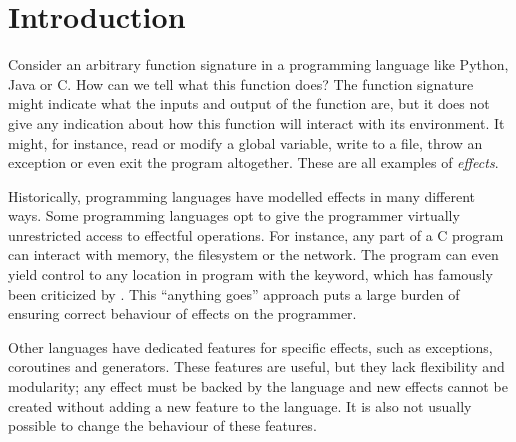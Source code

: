 \chapter{Introduction}\label{chap:introduction}


Consider an arbitrary function signature in a programming language like Python, Java or C. How can we tell what this function does? The function signature might indicate what the inputs and output of the function are, but it does not give any indication about how this function will interact with its environment. It might, for instance, read or modify a global variable, write to a file, throw an exception or even exit the program altogether. These are all examples of \emph{effects}.

Historically, programming languages have modelled effects in many different ways. Some programming languages opt to give the programmer virtually unrestricted access to effectful operations. For instance, any part of a C program can interact with memory, the filesystem or the network. The program can even yield control to any location in program with the  keyword, which has famously been criticized by \textcite{dijkstra_letters_1968}. This ``anything goes'' approach puts a large burden of ensuring correct behaviour of effects on the programmer.

Other languages have dedicated features for specific effects, such as exceptions, coroutines and generators. These features are useful, but they lack flexibility and modularity; any effect must be backed by the language and new effects cannot be created without adding a new feature to the language. It is also not usually possible to change the behaviour of these features.

